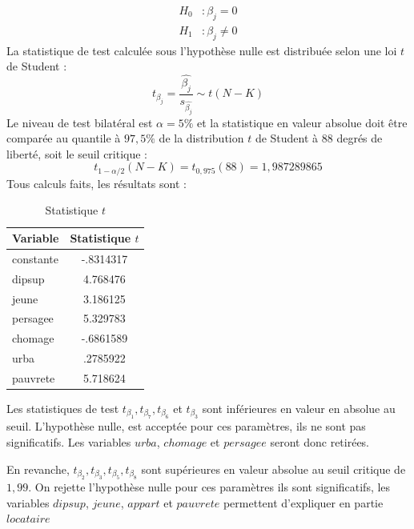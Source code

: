 \documentclass{article}
\begin{document}
\begin{equation*}
\begin{split}
    H_0 &: \beta_j =0 \\
    H_1 &: \beta_j \neq 0
\end{split}
\end{equation*}
La statistique de test calculée sous l'hypothèse nulle est distribuée selon une loi $t$ de Student : 
\begin{equation*}
    t_{\beta_j} = \frac{\hat{\beta_j}}{s_{\hat{\beta_j}}} \sim t(N-K)
\end{equation*}
Le niveau de test bilatéral est $\alpha = 5\%$ et la statistique en valeur absolue doit être comparée au quantile à $97,5\%$ de la distribution
 $t$ de Student à $88$ degrés de liberté, soit le seuil critique :
\begin{equation*}
    t_{1-\alpha/2}(N-K) = t_{0,975}(88) = 1,987289865 
\end{equation*}
Tous calculs faits, les résultats sont :
\begin{table}[H]
\centering
\caption{Statistique $t$}
\begin{tabular}{l*{1}{c}}
\toprule
Variable            &Statistique $t$\\
\midrule
constante      &   -.8314317\\
dipsup&    4.768476\\
jeune&    3.186125\\
persagee	 &5.329783\\
chomage&   -.6861589\\
urba   &    .2785922\\
pauvrete&    5.718624\\
\bottomrule
\end{tabular}
\end{table}
Les statistiques de test $t_{\beta_1},t_{\beta_7},t_{\beta_6}$ et $t_{\beta_3}$ sont inférieures en valeur en absolue au seuil. L'hypothèse nulle, est
acceptée pour ces paramètres, ils ne sont pas significatifs. Les variables $urba$, $chomage$ et $persagee$ seront donc retirées.

En revanche, $t_{\beta_2}, t_{\beta_3}, t_{\beta_5}, t_{\beta_8}$ sont supérieures en valeur absolue au seuil critique de $1,99$. On rejette l'hypothèse nulle pour ces paramètres
ils sont significatifs, les variables $dipsup$, $jeune$, $appart$ et $pauvrete$ permettent d'expliquer en partie $locataire$
\end{document}

